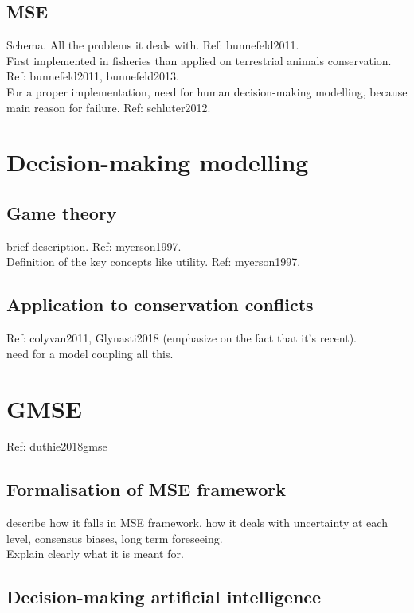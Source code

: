 \documentclass[12pt,a4paper]{article}
\begin{document}
\subsection{MSE}

Schema.
All the problems it deals with. Ref: bunnefeld2011.\\
First implemented in fisheries than applied on terrestrial animals conservation. Ref: bunnefeld2011, bunnefeld2013.\\

For a proper implementation, need for human decision-making modelling, because main reason for failure. Ref: schluter2012.
 
\section{Decision-making modelling}

\subsection{Game theory}
brief description. Ref: myerson1997.\\
Definition of the key concepts like utility. Ref: myerson1997.

\subsection{Application to conservation conflicts}
Ref: colyvan2011, Glynasti2018 (emphasize on the fact that it's recent).\\

need for a model coupling all this.
\section{GMSE} Ref: duthie2018gmse

\subsection{Formalisation of MSE framework}

describe how it falls in MSE framework, how it deals with uncertainty at each level, consensus biases, long term foreseeing.\\
Explain clearly what it is meant for.\\

\subsection{Decision-making artificial intelligence}
\end{document}
